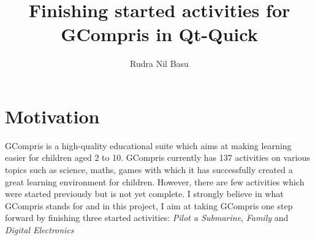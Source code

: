 \documentclass[preprint,12pt]{elsarticle}
\begin{document}
\begin{frontmatter}



\title{Finishing started activities for GCompris in Qt-Quick}


\author{Rudra Nil Basu}

\address{ \textbf{Email ID}: rudra.nil.basu.1996@gmail.com}
\address{ \textbf{Freenode IRC Nick}: rudra}
\address{ \textbf{Location}: Kolkata, West Bengal, India UTC+5.30}

\end{frontmatter}


\section{Motivation}
\label{S:1}


GCompris is a high-quality educational suite which aims at making learning easier for children aged 2 to 10. GCompris currently has 137 activities on various topics such as science, maths, games with which it has successfully created a great learning environment for children. However, there are few activities which were started previously but is not yet complete. I strongly believe in what GCompris stands for and in this project, I aim at taking GCompris one step forward by finishing three started activities: \textit{Pilot a Submarine}, \textit{Family} and \textit{Digital Electronics}
\end{document}
